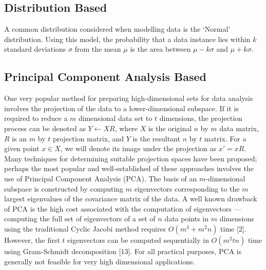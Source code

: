 \subsection{Distribution Based}
\label{anomalyDetection:approaches:distribution}
A common distribution considered when modelling data is the `Normal'
distribution. Using this model, the probability that a data instance lies within
$k$ standard deviations $\sigma$ from the mean $\mu$ is the area between
$\mu - k\sigma$ and $\mu + k\sigma$.

\subsection{Principal Component Analysis Based}
\label{anomalyDetection:pca}

\cite{Vries:2010}
One very popular method for preparing high-dimensional sets for data analysis involves the projection of the data to a lower-dimensional subspace. If it is required to reduce a $m$ dimensional data set to $t$ dimensions, the projection process can be denoted as $Y \leftarrow XR$, where $X$ is the original $n$ by $m$ data matrix, $R$ is an $m$ by $t$ projection matrix, and $Y$ is the resultant $n$ by $t$ matrix. For a given point $x \in X$, we will denote its image under the projection as $x' = xR$.
Many techniques for determining suitable projection spaces have been proposed; perhaps the most popular and well-established of these approaches involves the use of Principal Component Analysis (PCA). The basis of an $m$-dimensional subspace is constructed by computing $m$ eigenvectors corresponding to the $m$ largest eigenvalues of the covariance matrix of the data. A well known drawback of PCA is the high cost associated with the computation of eigenvectors --- computing the full set of eigenvectors of a set of $n$ data points in $m$ dimensions using the traditional Cyclic Jacobi method requires $O(m^3+m^2n)$ time [2]. However, the first $t$ eigenvectors can be computed sequentially in $O(m^2tn)$ time using Gram-Schmidt decomposition [13]. For all practical purposes, PCA is generally not feasible for very high dimensional applications.


